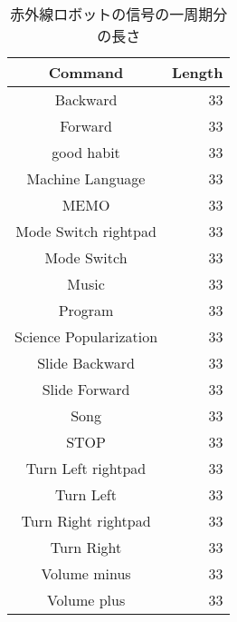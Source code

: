 \begin{table}[htbp] \begin{center}
    \caption{赤外線ロボットの信号の一周期分の長さ}
    \label{ir_robot_signal_ideal}
    \begin{tabular}{cr}
\hline
Command & Length \\
\hline
Backward & 33 \\
Forward & 33 \\
good habit & 33 \\
Machine Language & 33 \\
MEMO & 33 \\
Mode Switch rightpad & 33 \\
Mode Switch & 33 \\
Music & 33 \\
Program & 33 \\
Science Popularization & 33 \\
Slide Backward & 33 \\
Slide Forward & 33 \\
Song & 33 \\
STOP & 33 \\
Turn Left rightpad & 33 \\
Turn Left & 33 \\
Turn Right rightpad & 33 \\
Turn Right & 33 \\
Volume minus & 33 \\
Volume plus & 33 \\
\hline
    \end{tabular}
\end{center} \end{table}
